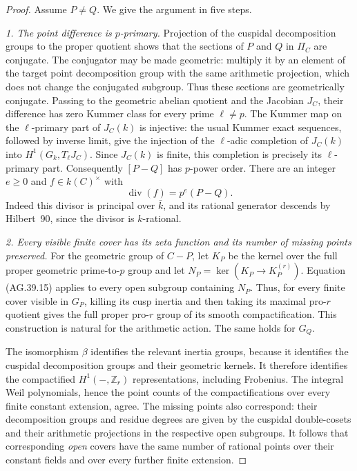\begin{proof}
Assume \(P\ne Q\). We give the argument in five steps.

\emph{1. The point difference is \(p\)-primary.}
Projection of the cuspidal decomposition groups to the
proper quotient shows that the sections of \(P\) and
\(Q\) in \(\Pi_C\) are conjugate. The conjugator
may be made geometric: multiply it by an element of
the target point decomposition group with the same
arithmetic projection, which does not change the
conjugated subgroup. Thus these sections are
geometrically conjugate. Passing
to the geometric abelian quotient and the Jacobian
\(J_C\), their difference has zero Kummer class for
every prime \(\ell\ne p\). The Kummer map on the
\(\ell\)-primary part of \(J_C(k)\) is injective:
the usual Kummer exact sequences, followed by inverse
limit, give the injection of the \(\ell\)-adic
completion of \(J_C(k)\) into
\(H^1(G_k,T_\ell J_C)\). Since \(J_C(k)\) is finite,
this completion is precisely its \(\ell\)-primary part.
Consequently \([P-Q]\) has \(p\)-power order. There are
an integer \(e\geq0\) and \(f\in k(C)^\times\) with
\[
                  \operatorname{div}(f)=p^e(P-Q).
                                                        \tag{AG.40.1}
\]
Indeed this divisor is principal over \(\bar k\), and
its rational generator descends by Hilbert~90, since
the divisor is \(k\)-rational.

\emph{2. Every visible finite cover has its zeta function
and its number of missing points preserved.}
For the geometric group of \(C-P\), let \(K_P\) be
the kernel over the full proper geometric prime-to-\(p\)
group and let \(N_P=\ker(K_P\to K_P^{(r)})\).
Equation (AG.39.15) applies to every open subgroup
containing \(N_P\). Thus, for every finite cover
visible in \(G_P\), killing its cusp inertia and then
taking its maximal pro-\(r\) quotient gives the full
proper pro-\(r\) group of its smooth compactification.
This construction is natural for the arithmetic action.
The same holds for \(G_Q\).

The isomorphism \(\beta\) identifies the relevant
inertia groups, because it identifies the cuspidal
decomposition groups and their geometric kernels.
It therefore identifies the compactified
\(H^1(-,\mathbb Z_r)\) representations, including
Frobenius. The integral Weil polynomials, hence the
point counts of the compactifications over every
finite constant extension, agree. The missing points
also correspond: their decomposition groups and
residue degrees are given by the cuspidal
double-cosets and their arithmetic projections in
the respective open subgroups. It follows that
corresponding \emph{open} covers have the same
number of rational points over their constant
fields and over every further finite extension.


\end{proof}
